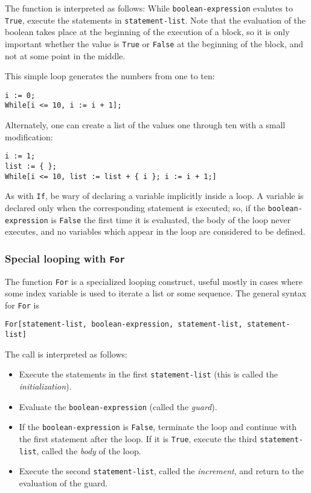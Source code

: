 The function is interpreted as follows: While \verb+boolean-expression+
evalutes to \verb+True+, execute the statements in \verb+statement-list+.
Note that the evaluation of the boolean takes place at the beginning of
the execution of a block, so it is only important whether the value is
\verb+True+ or \verb+False+ at the beginning of the block, and not at
some point in the middle.

This simple loop generates the numbers from one to ten:

\begin{verbatim}
i := 0;
While[i <= 10, i := i + 1];
\end{verbatim}

\noindent Alternately, one can create a list of the values one through ten with
a small modification:

\begin{verbatim}
i := 1;
list := { };
While[i <= 10, list := list + { i }; i := i + 1;]
\end{verbatim}

As with \verb+If+, be wary of declaring a variable implicitly inside a loop.
A variable is declared only when the corresponding statement is executed;
so, if the \verb+boolean-expression+ is \verb+False+ the first time it is
evaluated, the body of the loop never executes, and no variables which
appear in the loop are considered to be defined.

\subsubsection{Special looping with {\tt For}}

The function \verb+For+ is a specialized looping construct, useful mostly
in cases where some index variable is used to iterate a list or some sequence.
The general syntax for \verb+For+ is

\begin{verbatim}
For[statement-list, boolean-expression, statement-list, statement-list]
\end{verbatim}

\noindent The call is interpreted as follows:
\begin{itemize}
\item Execute the statements in
the first \verb+statement-list+ (this is called the {\em initialization}).
\item Evaluate the \verb+boolean-expression+ (called the {\em guard}).
\item If the \verb+boolean-expression+ is \verb+False+, terminate the loop and
continue with the first statement after the loop.  If it is \verb+True+,
execute the third \verb+statement-list+, called the {\em body} of the loop.
\item Execute the second \verb+statement-list+, called the {\em increment},
and return to the evaluation of the guard.
\end{itemize}

